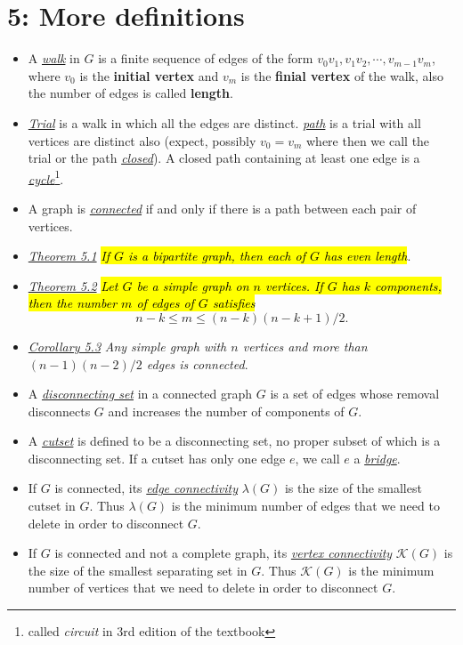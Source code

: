 \documentclass[12pt,a4paper, twocolumn]{article}
\begin{document}
\section*{5: More definitions}
\begin{itemize}
		\item A \underline{\emph{\color{magenta} walk}} in $G$ is a finite sequence of edges of the form $v_0 v_1, v_1 v_2, \cdots, v_{m-1} v_m$, where $v_0$ is the \textbf{initial vertex} and $v_m$ is the \textbf{finial vertex} of the walk, also the number of edges is called \textbf{length}.
		\item \underline{\emph{\color{magenta} Trial}} is a walk in which all the edges are distinct. \underline{\emph{\color{magenta} path}} is a trial with all vertices are distinct also (expect, possibly $v_0 = v_m$ where then we call the trial or the path \underline{\emph{\color{magenta} closed}}). A closed path containing at least one edge is a \underline{\emph{\color{magenta} cycle}}\footnote{called \emph{circuit} in 3rd edition of the textbook}.
		\item A graph is \underline{\emph{\color{magenta} connected}} if and only if there is a path between each pair of vertices.
		\item \underline{\emph{\color{magenta} Theorem 5.1}} \hl{\emph{If $G$ is a bipartite graph, then each of $G$ has even length}}.
		\item \underline{\emph{\color{magenta} Theorem 5.2}} \hl{\emph{Let $G$ be a simple graph on $n$ vertices. If $G$ has $k$ components, then the number $m$ of edges of $G$ satisfies}}
				\begin{equation}
						n-k \leq m \leq (n-k)(n-k+1)/2.
				\end{equation}
		\item \underline{\emph{\color{magenta} Corollary 5.3}} \emph{Any simple graph with $n$ vertices and more than $(n-1)(n-2)/2$ edges is connected}.
		\item A \underline{\emph{\color{magenta} disconnecting set}} in a connected graph $G$ is a set of edges whose removal disconnects $G$ and increases the number of components of $G$.
		\item A \underline{\emph{\color{magenta} cutset}} is defined to be a disconnecting set, no proper subset of which is a disconnecting set. If a cutset has only one edge $e$, we call $e$ a \underline{\emph{\color{magenta} bridge}}.
		\item If $G$ is connected, its \underline{\emph{\color{magenta} edge connectivity}} $\lambda (G)$ is the size of the smallest cutset in $G$. Thus $\lambda (G)$ is the minimum number of edges that we need to delete in order to disconnect $G$.
		\item If $G$ is connected and not a complete graph, its \underline{\emph{\color{magenta} vertex connectivity}} $\mathcal{K}(G)$ is the size of the smallest separating set in $G$. Thus $\mathcal{K}(G)$ is the minimum number of vertices that we need to delete in order to disconnect $G$.
\end{itemize}
\clearpage
\end{document}
